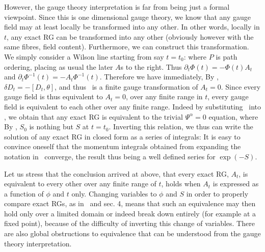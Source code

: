 However, the gauge theory interpretation 
is far from being just a formal viewpoint.
Since this is one dimensional gauge theory, we know that
any gauge field may at least locally be transformed into
any other. In other words, locally in $t$, any exact RG
can be transformed into any other (obviously however with
the same fibres, \ie field content).
Furthermore, we can construct this transformation.
We simply consider a Wilson line starting from say $t=t_0$:
\eqn{}
where $P$ is path ordering, placing as usual the later $A$s to the right. 
Thus $\partial_t\Phi(t)=-\Phi(t) A_t$ and $\partial_t\Phi^{-1}(t)
=-A_t\Phi^{-1}(t)$.
Therefore we have immediately,
\eqn{}
By \gaa, $\delta D_t=-[D_t,\theta]$, and thus \triva\ 
is a finite gauge transformation %
of $A_t=0$. Since every
gauge field is thus equivalent to $A_t=0$, over any finite range in $t$,
every gauge field is equivalent
to each other over any finite range.
Indeed by substituting \triva\ into \simplerg, we obtain that any exact RG
is equivalent to the trivial $\Psi^\alpha=0$ equation, 
\eqn{}
where
\eqn{}
By \Ph, $S_0$ is nothing but $S$ at $t=t_0$.
Inverting this relation, we thus can write the solution of any exact
RG in closed form as a series of integrals:
\eqn{}
It is easy to
convince oneself that the momentum integrals obtained from expanding 
the notation in \trivii\ converge, 
the result thus being a well defined series
for $\exp(- S)$. 

Let us stress that the conclusion arrived at above,
that every exact RG, \ie $A_t$, is equivalent to every other
over any finite range of $t$, holds when $A_t$ is expressed  
as a function of $\phi$ and $t$ only. Changing variables to 
$\phi$ and $S$ in order to properly 
compare exact RGs, as in \newpsi\ and sec. 4, means that
such an equivalence may then hold only over a limited domain or 
indeed break down entirely
(for example at a fixed point), because of the difficulty of inverting
this change of variables. There are also global obstructions
to equivalence that can be understood from the gauge theory interpretation.

